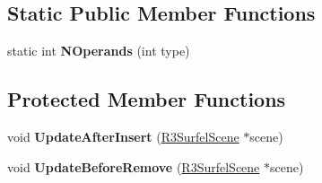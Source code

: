 \subsection*{Static Public Member Functions}
\begin{DoxyCompactItemize}
\item 
static int {\bfseries N\+Operands} (int type)\hypertarget{class_r3_surfel_label_property_ac0cadace07095226d611f80863c0a361}{}\label{class_r3_surfel_label_property_ac0cadace07095226d611f80863c0a361}

\end{DoxyCompactItemize}
\subsection*{Protected Member Functions}
\begin{DoxyCompactItemize}
\item 
void {\bfseries Update\+After\+Insert} (\hyperlink{class_r3_surfel_scene}{R3\+Surfel\+Scene} $\ast$scene)\hypertarget{class_r3_surfel_label_property_a7fa11c2eddf30a8f04e27096df0bc426}{}\label{class_r3_surfel_label_property_a7fa11c2eddf30a8f04e27096df0bc426}

\item 
void {\bfseries Update\+Before\+Remove} (\hyperlink{class_r3_surfel_scene}{R3\+Surfel\+Scene} $\ast$scene)\hypertarget{class_r3_surfel_label_property_ab39be68c10a1883c3db023135d696836}{}\label{class_r3_surfel_label_property_ab39be68c10a1883c3db023135d696836}

\end{DoxyCompactItemize}

